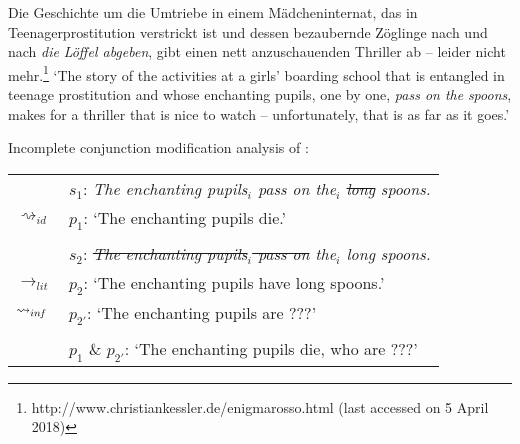 \documentclass[output=paper]{langsci/langscibook}
\begin{document}
\ea \label{long spoons}
Die Geschichte um die Umtriebe in einem Mädcheninternat, das in Teen\-agerprostitution verstrickt ist und dessen bezaubernde Zöglinge nach und nach \textit{die} \underline{} \textit{Löffel abgeben}, gibt einen nett anzuschauenden Thriller ab -- leider nicht mehr.\footnote{http://www.christiankessler.de/enigmarosso.html (last accessed on 5 April 2018)}
\vspace{5pt}
\glt `The story of the activities at a girls' boarding school that is entangled in teenage prostitution and whose enchanting pupils, one by one, \textit{pass on the} \underline{} \textit{spoons}, makes for a thriller that is nice to watch -- unfortunately, that is as far as it goes.'
\z

\ea \label{analysis long spoons -- incomplete} 
Incomplete conjunction modification analysis of : \\
\vspace{5pt}
\begin{tabular}{ll}
								& 	$s_{1}$: \hspace{4pt} \textit{The enchanting pupils$_{i}$ pass on the$_{i}$ \sout{long} spoons.} \\
$\rightsquigarrow_{id}$				&	$p_{1}$: \hspace{1pt} `The enchanting pupils die.' \\
\vspace{-5pt} \\
								& 	$s_{2}$: \hspace{4pt} \textit{\sout{The enchanting pupils$_{i}$ pass on} the$_{i}$ long spoons.} \\
$\rightarrow_{lit}$					&	$p_{2}$: \hspace{1pt} `The enchanting pupils have long spoons.' \\
$\rightsquigarrow_{in\hspace{-0.8pt} f}$	&	$p_{2'}$: \hspace{-1.5pt} `The enchanting pupils are ???' \\
\vspace{-5pt} \\
								&	$p_{1}$ \& $p_{2'}$: `The enchanting pupils die, who are ???' \\
\end{tabular}
\z
\end{document}
